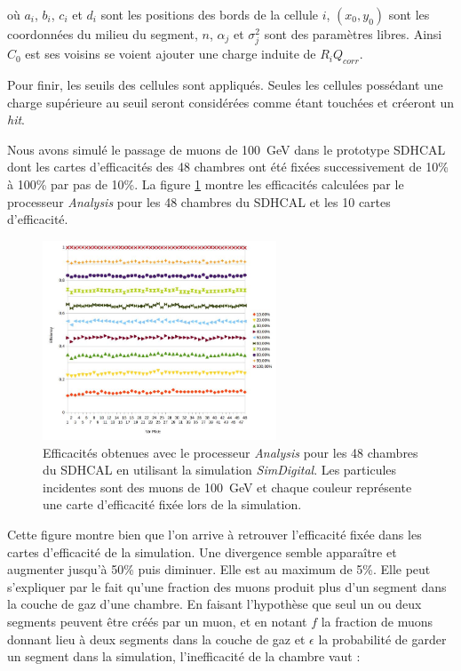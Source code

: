 où $a_i$, $b_i$, $c_i$ et $d_i$ sont les positions des bords de la cellule $i$, $(x_0,y_0)$ sont les coordonnées du milieu du segment, $n$, $\alpha_j$ et $\sigma_j^2$ sont des paramètres libres. Ainsi $C_0$ est ses voisins se voient ajouter une charge induite de $R_iQ_{corr}$.

Pour finir, les seuils des cellules sont appliqués. Seules les cellules possédant une charge supérieure au seuil seront considérées comme étant touchées et créeront un \textit{hit}.

Nous avons simulé le passage de muons de \SI{100}{\giga\eV} dans le prototype SDHCAL dont les cartes d'efficacités des \num{48} chambres ont été fixées successivement de \num{10}\% à \num{100}\% par pas de \num{10}\%. La figure \ref{effisimul} montre les efficacités calculées par le processeur \textit{Analysis} pour les \num{48} chambres du SDHCAL et les \num{10} cartes d'efficacité.

\begin{figure}[ht!]
	\centering
	\includegraphics[width=0.62\textwidth]{GLA/effisimul.jpg}
	\captionsetup{type=figure}\caption{Efficacités obtenues avec le processeur \textit{Analysis} pour les \num{48} chambres du SDHCAL en utilisant la simulation \textit{SimDigital}. Les particules incidentes sont des muons de \SI{100}{\giga\eV} et chaque couleur représente une carte d'efficacité fixée lors de la simulation.}
	\label{effisimul}
\end{figure}

Cette figure montre bien que l'on arrive à retrouver l'efficacité fixée dans les cartes d'efficacité de la simulation. Une divergence semble apparaître et augmenter jusqu'à \num{50}\% puis diminuer. Elle est au maximum de \num{5}\%. Elle peut s'expliquer par le fait qu'une fraction des muons produit plus d'un segment dans la couche de gaz d'une chambre. En faisant l'hypothèse que seul un ou deux segments peuvent être créés par un muon, et en notant $f$ la fraction de muons donnant lieu à deux segments dans la couche de gaz et $\epsilon$ la probabilité de garder un segment dans la simulation, l'inefficacité de la chambre vaut :

